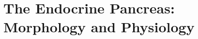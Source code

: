 






\section[The Endocrine Pancreas: Morphology and Physiology]{The Endocrine Pancreas: Morphology and Physiology}  %
\label{sec:int_endopanc}


